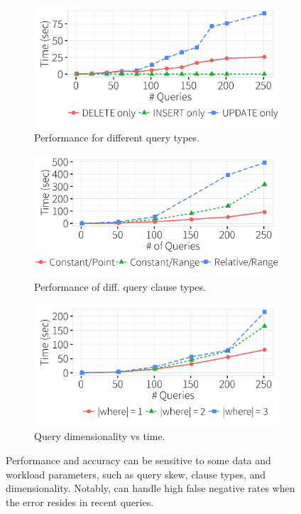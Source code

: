   \begin{figure}[!htb]
    \hspace*{-.1in}
    \centering
     \begin{subfigure}[t]{.33\textwidth}
      \includegraphics[width = .99\columnwidth]{figures/indelup_time}
      \caption{Performance for different query types.}
      \label{f:indelup_time} 
    \end{subfigure}
    \begin{subfigure}[t]{.33\textwidth}
      \includegraphics[width = .99\columnwidth]{figures/pointrelv_time}
      \caption{Performance of diff. query clause types.}
      \label{f:qidx_time} 
    \end{subfigure}
    \begin{subfigure}[t]{.33\textwidth}
      \includegraphics[width = .99\columnwidth]{figures/where_time}
      \caption{Query dimensionality vs time.}
      \label{f:where_time} 
    \end{subfigure}
    \caption{
    Performance and accuracy can be sensitive to some data and workload parameters, such as query skew, clause types, and dimensionality.  Notably, \sys can handle high false negative rates when the error resides in recent queries.}
  \end{figure}
 



